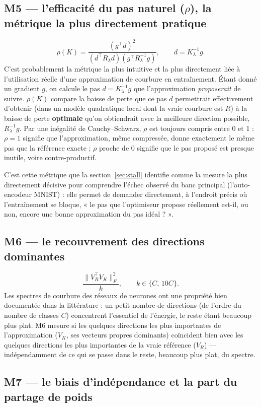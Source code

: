 \documentclass[11pt,a4paper]{article}
\begin{document}
\subsection{M5 — l'efficacité du pas naturel ($\rho$), la métrique la plus directement pratique}

\[
\rho(K) = \frac{(g^\top d)^2}{(d^\top R_\lambda d)(g^\top R_\lambda^{-1}g)}, \qquad d = K_\lambda^{-1}g.
\]
C'est probablement la métrique la plus intuitive et la plus directement liée à l'utilisation réelle
d'une approximation de courbure en entraînement. Étant donné un gradient $g$, on calcule le pas
$d=K_\lambda^{-1}g$ que l'approximation \emph{proposerait} de suivre. $\rho(K)$ compare la baisse de
perte que ce pas $d$ permettrait effectivement d'obtenir (dans un modèle quadratique local dont la
vraie courbure est $R$) à la baisse de perte \textbf{optimale} qu'on obtiendrait avec la meilleure
direction possible, $R_\lambda^{-1}g$. Par une inégalité de Cauchy--Schwarz, $\rho$ est toujours
compris entre 0 et 1 : $\rho=1$ signifie que l'approximation, même compressée, donne exactement le
même pas que la référence exacte ; $\rho$ proche de 0 signifie que le pas proposé est presque
inutile, voire contre-productif.

C'est cette métrique que la section~\ref{sec:stall} identifie comme la mesure la plus directement
décisive pour comprendre l'échec observé du banc principal (l'auto-encodeur MNIST) : elle permet de
demander directement, à l'endroit précis où l'entraînement se bloque, « le pas que l'optimiseur
propose réellement est-il, ou non, encore une bonne approximation du pas idéal ? ».

\subsection{M6 — le recouvrement des directions dominantes}

\[
\frac{\|V_R^\top V_K\|_F^2}{k}, \qquad k\in\{C,\,10C\}.
\]
Les spectres de courbure des réseaux de neurones ont une propriété bien documentée dans la
littérature : un petit nombre de directions (de l'ordre du nombre de classes $C$) concentrent
l'essentiel de l'énergie, le reste étant beaucoup plus plat. M6 mesure si les quelques directions les
plus importantes de l'approximation ($V_K$, ses vecteurs propres dominants) coïncident bien avec les
quelques directions les plus importantes de la vraie référence ($V_R$) — indépendamment de ce qui se
passe dans le reste, beaucoup plus plat, du spectre.

\subsection{M7 — le biais d'indépendance et la part du partage de poids}
\end{document}
